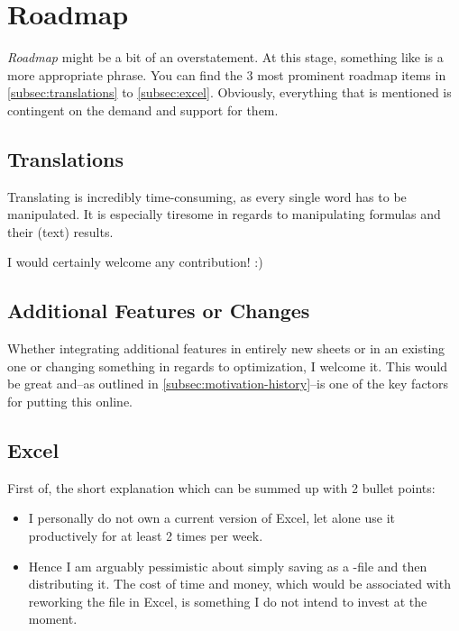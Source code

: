 \section{Roadmap}
\label{sec:roadmap}

\emph{Roadmap} might be a bit of an overstatement.
At this stage, something like  is a more appropriate phrase.
You can find the 3 most prominent roadmap items in \autoref{subsec:translations} to \autoref{subsec:excel}.
Obviously, everything that is mentioned is contingent on the demand and support for them.

\subsection{Translations}
\label{subsec:translations}

Translating \tfn is incredibly time-consuming, as every single word has to be manipulated.
It is especially tiresome in regards to manipulating formulas and their (text) results.

I would certainly welcome any contribution! :)

\subsection{Additional Features or Changes}
\label{subsec:additional-features}

Whether integrating additional features in entirely new sheets or in an existing one or changing something in regards to optimization, I welcome it.
This would be great and--as outlined in \autoref{subsec:motivation-history}--is one of the key factors for putting this online.

\subsection{Excel}
\label{subsec:excel}

First of, the short explanation which can be summed up with 2 bullet points:
\begin{itemize}
	\item I personally do not own a current version of Excel, let alone use it productively for at least 2 times per week.
	\item Hence I am arguably pessimistic about simply saving \tfn as a -file and then distributing it.
	The cost of time and money, which would be associated with reworking the file in Excel, is something I do not intend to invest at the moment.
\end{itemize}

